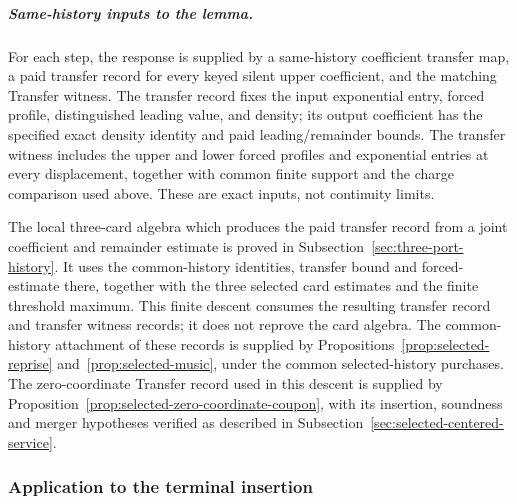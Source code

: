\subparagraph{Same-history inputs to the lemma.}
For each step, the response is supplied by a same-history coefficient transfer map, a
paid transfer record for every keyed silent upper coefficient, and the matching
Transfer witness. The transfer record fixes the input exponential entry, forced
profile, distinguished leading value, and density; its output coefficient
has the specified exact density identity and paid leading/remainder bounds.
The transfer witness includes the upper and lower forced profiles and
exponential entries at every displacement, together with common finite
support and the charge comparison used above. These are exact inputs, not
continuity limits.

The local three-card algebra which produces the paid transfer record from a
joint coefficient and remainder estimate is proved in Subsection~\ref{sec:three-port-history}.
It uses the common-history identities, transfer bound and forced-estimate
there, together with the three selected card estimates and the finite
threshold maximum. This finite descent consumes the resulting transfer record and
transfer witness records; it does not reprove the card algebra. The common-history attachment of these records is supplied by
Propositions~\ref{prop:selected-reprise} and~\ref{prop:selected-music},
under the common selected-history purchases. The zero-coordinate
Transfer record used in this descent is supplied by
Proposition~\ref{prop:selected-zero-coordinate-coupon}, with its
insertion, soundness and merger hypotheses verified as described in
Subsection~\ref{sec:selected-centered-service}.

\subsubsection{Application to the terminal insertion}

